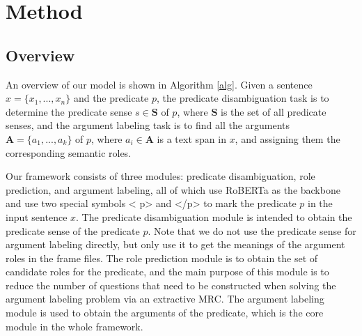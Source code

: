 \documentclass[11pt]{article}
\begin{document}
\section{Method}
\subsection{Overview}
An overview of our model is shown in Algorithm \ref{alg}. Given a sentence $x=\{x_1,...,x_n\}$ and the predicate $p$, the predicate disambiguation task is to determine the predicate sense $s\in \bm{S}$ of $p$, where $\bm{S}$ is the set of all predicate senses, and the argument labeling task is to find all the arguments $\bm{A}=\{a_1,...,a_k\}$ of $p$, where $a_i \in \bm{A}$ is a text span in $x$, and assigning them the corresponding semantic roles.
\par
Our framework consists of three modules: predicate disambiguation, role prediction, and argument labeling, all of which use RoBERTa \cite{liu2019roberta}  as the backbone and use two special symbols
\textless{} p\textgreater{} and \textless{}/p\textgreater{} 
to mark the predicate $p$ in the input sentence $x$.
The predicate disambiguation module is intended to obtain the predicate sense of the predicate $p$. Note that we do not use the predicate sense for argument labeling directly, but only use it to get the meanings of the argument roles in the frame files.
The role prediction module is to obtain the set of candidate roles for the predicate, and the main purpose of this module is to reduce the number of questions that need to be constructed when solving the argument labeling problem via an extractive MRC.
The argument labeling module is used to obtain the arguments of the predicate, which is the core module in the whole framework.
\end{document}
